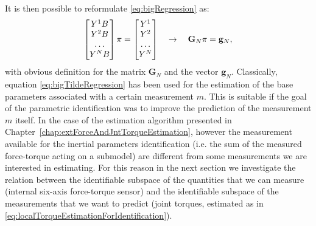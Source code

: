 It is then possible to reformulate \eqref{eq:bigRegression} as:
\begin{equation}
\label{eq:bigTildeRegression}
\begin{bmatrix} 
{Y}^1 B
\\
{Y}^2 B
\\
\dots
\\
{Y}^N B
\\
\end{bmatrix}
\pi 
=
\begin{bmatrix}
Y^1
\\
Y^2
\\
\dots
\\
Y^N
\end{bmatrix} \quad \rightarrow \quad \mathbf{G}_N \pi = \mathbf{g}_N ,
\end{equation}
with obvious definition for the matrix  $\mathbf{G}_N$ and the vector $ \mathbf{g}_N$.
Classically, equation \eqref{eq:bigTildeRegression} has been used for the estimation of the base
parameters associated with a certain measurement $m$. This is suitable if the goal of the parametric identification was to improve the prediction of the measurement $m$ itself. In the case of the estimation algorithm presented in Chapter~\ref{chap:extForceAndJntTorqueEstimation}, however the measurement available for the inertial parameters identification (i.e. the sum of the measured force-torque acting on a submodel) are different from some measurements we are interested in estimating. For this reason in the next section we investigate the relation between the identifiable subspace of the quantities that we can measure (internal six-axis force-torque sensor) and the identifiable subspace of the measurements that we want to predict (joint torques, estimated as in \eqref{eq:localTorqueEstimationForIdentification}).   


